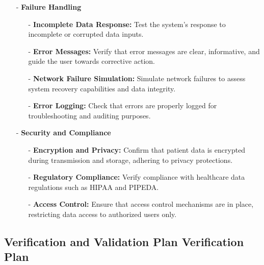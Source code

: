\documentclass[12pt, titlepage]{article}
\begin{document}
\begin{itemize}
    \item[-] \textbf{Failure Handling}
    \begin{itemize}
        \item[-] \textbf{Incomplete Data Response:} Test the system's response to incomplete or corrupted data inputs.
        \item[-] \textbf{Error Messages:} Verify that error messages are clear, informative, and guide the user towards corrective action.
        \item[-] \textbf{Network Failure Simulation:} Simulate network failures to assess system recovery capabilities and data integrity.
        \item[-] \textbf{Error Logging:} Check that errors are properly logged for troubleshooting and auditing purposes.
    \end{itemize}

    \item[-] \textbf{Security and Compliance}
    \begin{itemize}
        \item[-] \textbf{Encryption and Privacy:} Confirm that patient data is encrypted during transmission and storage, adhering to privacy protections.
        \item[-] \textbf{Regulatory Compliance:} Verify compliance with healthcare data regulations such as HIPAA and PIPEDA.
        \item[-] \textbf{Access Control:} Ensure that access control mechanisms are in place, restricting data access to authorized users only.
    \end{itemize}
\end{itemize}
\subsection{Verification and Validation Plan Verification Plan}
\end{document}

